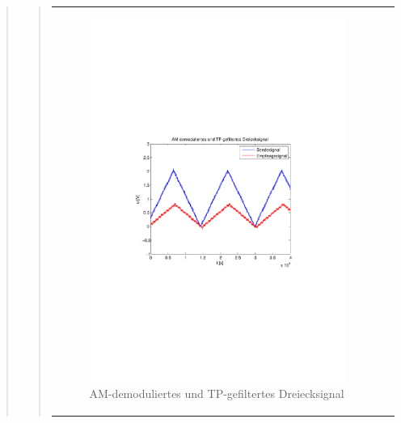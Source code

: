 \begin{quote}
\begin{quote}
\begin{center}
\begin{tabular}{ll}
\begin{minipage}{0.6\textwidth}
                     \begin{figure}[H]
                        \label{fig:}
                        \includegraphics[scale=0.5, trim = 2cm 6.5cm 1.5cm
                        8.5cm, clip]{./Bilder/synchDemodFilter_dreieck} %
                        \caption{AM-demoduliertes und
                        TP-gefiltertes Dreiecksignal}
                    \end{figure}
               \vspace{-1.5em}

                \end{minipage}

            \end{tabular}
            \end{center}
            

\end{quote}
\end{quote}
